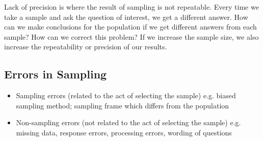 ﻿\documentclass[]{report}
\begin{document}
Lack of precision is where the result of sampling is not repeatable. Every time we take a sample and ask the question of interest, we get a different answer. How can we make conclusions for the population if we get different answers from each sample? How can we correct this problem? If we increase the sample size, we also increase the repeatability or precision of our results. 



\subsection{Errors in Sampling}

\begin{itemize}
\item Sampling errors (related to the act of selecting the sample) e.g. biased sampling method; sampling frame which differs from the population

\item Non-sampling errors (not related to the act of selecting the sample) e.g. missing data, response errors, processing errors, wording of questions 
\end{itemize}
\end{document}
